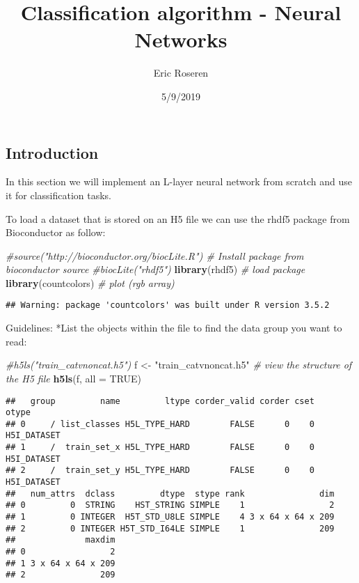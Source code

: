 \documentclass[]{article}
\title{Classification algorithm - Neural Networks}
\author{Eric Roseren}
\date{5/9/2019}
\newenvironment{Shaded}{\begin{snugshade}}{\end{snugshade}}
\newcommand{\KeywordTok}[1]{\textcolor[rgb]{0.13,0.29,0.53}{\textbf{#1}}}
\newcommand{\DataTypeTok}[1]{\textcolor[rgb]{0.13,0.29,0.53}{#1}}
\newcommand{\StringTok}[1]{\textcolor[rgb]{0.31,0.60,0.02}{#1}}
\newcommand{\CommentTok}[1]{\textcolor[rgb]{0.56,0.35,0.01}{\textit{#1}}}
\newcommand{\OtherTok}[1]{\textcolor[rgb]{0.56,0.35,0.01}{#1}}
\newcommand{\NormalTok}[1]{#1}
\begin{document}
\maketitle

\subsection{Introduction}\label{introduction}

In this section we will implement an L-layer neural network from scratch
and use it for classification tasks.

To load a dataset that is stored on an H5 file we can use the rhdf5
package from Bioconductor as follow:

\begin{Shaded}
\begin{Highlighting}[]
\CommentTok{#source("http://bioconductor.org/biocLite.R") # Install package from bioconductor source}
\CommentTok{#biocLite("rhdf5")}
\KeywordTok{library}\NormalTok{(rhdf5) }\CommentTok{# load package }
\KeywordTok{library}\NormalTok{(countcolors)  }\CommentTok{# plot (rgb array)}
\end{Highlighting}
\end{Shaded}

\begin{verbatim}
## Warning: package 'countcolors' was built under R version 3.5.2
\end{verbatim}

Guidelines: *List the objects within the file to find the data group you
want to read:

\begin{Shaded}
\begin{Highlighting}[]
\CommentTok{#h5ls("train_catvnoncat.h5")}
\NormalTok{f <-}\StringTok{ "train_catvnoncat.h5"}
\CommentTok{# view the structure of the H5 file}
\KeywordTok{h5ls}\NormalTok{(f, }\DataTypeTok{all =} \OtherTok{TRUE}\NormalTok{)}
\end{Highlighting}
\end{Shaded}

\begin{verbatim}
##   group         name         ltype corder_valid corder cset       otype
## 0     / list_classes H5L_TYPE_HARD        FALSE      0    0 H5I_DATASET
## 1     /  train_set_x H5L_TYPE_HARD        FALSE      0    0 H5I_DATASET
## 2     /  train_set_y H5L_TYPE_HARD        FALSE      0    0 H5I_DATASET
##   num_attrs  dclass         dtype  stype rank               dim
## 0         0  STRING    HST_STRING SIMPLE    1                 2
## 1         0 INTEGER  H5T_STD_U8LE SIMPLE    4 3 x 64 x 64 x 209
## 2         0 INTEGER H5T_STD_I64LE SIMPLE    1               209
##              maxdim
## 0                 2
## 1 3 x 64 x 64 x 209
## 2               209
\end{verbatim}
\end{document}
